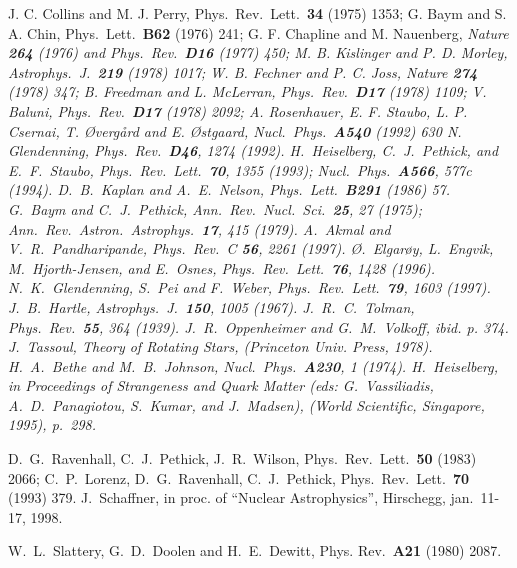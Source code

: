 \begin{multicols}{2}
\begin{references}
  J. C. Collins and M. J. Perry, Phys.\ Rev.\ Lett.\ {\bf 34} (1975)
 1353;
  G. Baym and S. A. Chin, Phys.\ Lett.\ {\bf B62} (1976) 241;
  G. F. Chapline and M. Nauenberg,
  \it Nature {\bf 264} (1976) and Phys.\ Rev.\ {\bf D16} (1977) 450;
  M. B. Kislinger and P. D. Morley, Astrophys.\ J.\ {\bf 219} (1978) 1017;
  W. B. Fechner and P. C. Joss, Nature {\bf 274} (1978) 347;
  B. Freedman and L. McLerran, Phys.\ Rev.\ {\bf D17} (1978) 1109;
  V. Baluni, Phys.\ Rev.\ {\bf D17} (1978) 2092;
  A. Rosenhauer, E. F. Staubo, L. P. Csernai, T. \O verg\aa rd 
        and E. \O stgaard, Nucl.\ Phys.\ {\bf A540} (1992) 630
 N. Glendenning, Phys.\ Rev.\ {\bf D46}, 1274 (1992).
 H.\ Heiselberg, C.\ J.\ Pethick, and E.\ F.\ Staubo, 
              Phys.\ Rev.\ Lett.\ {\bf 70}, 1355 (1993);
              Nucl.\ Phys.\ {\bf A566}, 577c (1994).
 D.\ B.\  Kaplan and A.\ E.\ Nelson, Phys.\ Lett.\ 
             {\bf B291} (1986) 57.
 G.\ Baym and C.\ J.\ Pethick, Ann.\ Rev.\ Nucl.\ Sci.\ {\bf 25},
27 (1975); Ann.\ Rev.\ Astron.\ Astrophys.\ {\bf 17}, 415 (1979).
\bibitem{vijay} A.\ Akmal and V.\ R.\ Pandharipande, Phys.\ Rev.\ C {\bf 56},
                2261 (1997).
 \O.\ Elgar\o y, L.\ Engvik, M.\ Hjorth-Jensen, and 
                   E.\ Osnes, Phys.\ Rev.\ Lett.\ {\bf 76}, 1428 (1996).
\bibitem{GPW} N.\ K.\ Glendenning, S.\ Pei and F.\ Weber, 
              Phys.\ Rev.\ Lett.\ {\bf 79}, 1603 (1997).
 J.\ B.\ Hartle, Astrophys.\ J.\ {\bf 150}, 1005 (1967).
\bibitem{TOV} J.\ R.\ C.\ Tolman, Phys.\ Rev.\ {\bf 55}, 364 (1939).
              J.\ R.\ Oppenheimer and G.\ M.\ Volkoff, {\it ibid.} p. 374.
\bibitem{Tassoul} J.\ Tassoul, {\em Theory of Rotating Stars}, (Princeton Univ.
                  Press, 1978).
 H.\ A.\ Bethe and M.\ B.\ Johnson, 
             Nucl.\ Phys.\ {\bf A230}, 1 (1974).
 H.\ Heiselberg, in
      Proceedings of  Strangeness and Quark Matter (eds: G.\ Vassiliadis,
      A.\ D.\ Panagiotou, S.\ Kumar, and J.\ Madsen), (World Scientific,
      Singapore,  1995), p.\ 298. 

 D.\ G.\ Ravenhall, C.\ J.\ Pethick, J.\ R.\ Wilson,
          Phys.\ Rev.\ Lett.\ {\bf 50} (1983) 2066; C.\ P.\ Lorenz,
   D.\ G.\  Ravenhall, C.\ J.\ Pethick, 
   Phys.\ Rev.\ Lett.\ {\bf 70} (1993) 379.
 J.\ Schaffner, in proc. of ``Nuclear Astrophysics'',
                    Hirschegg, jan.\ 11-17, 1998.
 

 W.\ L.\ Slattery, G.\ D.\  Doolen and H.\ E.\ Dewitt, 
              Phys. Rev.\ {\bf A21} (1980) 2087.

\end{references} 

\end{multicols}

